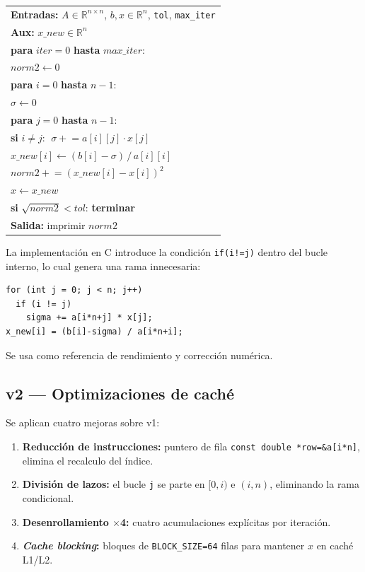 \documentclass[a4paper,twocolumn]{article}
\begin{document}
\begin{center}
\small
\begin{tabular}{l}
\hline
\textbf{Entradas:} $A\in\mathbb{R}^{n\times n}$, $b,x\in\mathbb{R}^n$,
  \texttt{tol}, \texttt{max\_iter}\\
\textbf{Aux:} $x\_new\in\mathbb{R}^n$\\
\hline
\textbf{para} $\mathit{iter}=0$ \textbf{hasta} $\mathit{max\_iter}$:\\
\quad $\mathit{norm2} \leftarrow 0$\\
\quad \textbf{para} $i=0$ \textbf{hasta} $n-1$:\\
\quad\quad $\sigma \leftarrow 0$\\
\quad\quad \textbf{para} $j=0$ \textbf{hasta} $n-1$:\\
\quad\quad\quad \textbf{si} $i \neq j$: $\;\sigma \mathrel{+}= a[i][j]\cdot x[j]$\\
\quad\quad $x\_new[i] \leftarrow (b[i]-\sigma)\,/\,a[i][i]$\\
\quad\quad $\mathit{norm2} \mathrel{+}= (x\_new[i]-x[i])^2$\\
\quad $x \leftarrow x\_new$\\
\quad \textbf{si} $\sqrt{\mathit{norm2}} < \mathit{tol}$: \textbf{terminar}\\
\textbf{Salida:} imprimir $\mathit{norm2}$\\
\hline
\end{tabular}
\end{center}

La implementación en C introduce la condición \texttt{if(i!=j)}
dentro del bucle interno, lo cual genera una rama innecesaria:

\begin{lstlisting}
for (int j = 0; j < n; j++)
  if (i != j)
    sigma += a[i*n+j] * x[j];
x_new[i] = (b[i]-sigma) / a[i*n+i];
\end{lstlisting}

Se usa como referencia de rendimiento y corrección numérica.

\subsection{v2 --- Optimizaciones de caché}

Se aplican cuatro mejoras sobre v1:

\begin{enumerate}
  \item \textbf{Reducción de instrucciones:} puntero de fila
        \texttt{const double *row=\&a[i*n]}, elimina el recalculo del índice.
  \item \textbf{División de lazos:} el bucle \texttt{j} se parte en
        $[0,i)$ e $(i,n)$, eliminando la rama condicional.
  \item \textbf{Desenrollamiento $\times$4:} cuatro acumulaciones explícitas
        por iteración.
  \item \textbf{\textit{Cache blocking}:} bloques de \texttt{BLOCK\_SIZE=64}
        filas para mantener $x$ en caché L1/L2.
\end{enumerate}
\end{document}
